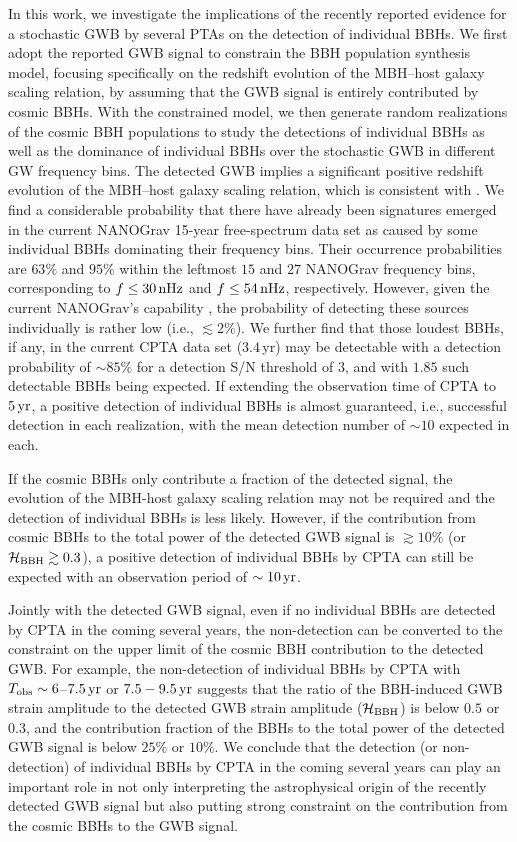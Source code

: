 \documentclass[twocolumn]{aastex631}
\newcommand{\calH}{{\mathcal{H}}}
\newcommand{\obs}{_{\rm obs}}
\newcommand{\yr}{{\rm\,yr}}
\newcommand{\nhz}{{\rm\,nHz}}
\begin{document}
In this work, we investigate the implications of the recently reported evidence
for a stochastic GWB by several PTAs \citep{NG23hd, EPTA23hd,PPTA23hd, CPTA23hd}
on the detection of individual BBHs. We first adopt the reported GWB signal to
constrain the BBH population synthesis model, focusing specifically on the
redshift evolution of the MBH--host galaxy scaling relation, by assuming that
the GWB signal is entirely contributed by cosmic BBHs. With the constrained
model, we then generate random realizations of the cosmic BBH populations to
study the detections of individual BBHs as well as the dominance of individual
BBHs over the stochastic GWB in different GW frequency bins. The detected GWB
implies a significant positive redshift evolution of the MBH--host galaxy
scaling relation, which is consistent with \citet{CYL23cgws}. We find a
considerable probability that there have already been signatures emerged in the
current NANOGrav 15-year free-spectrum data set as caused by some individual
BBHs dominating their frequency bins. Their occurrence probabilities are $63\%$
and $95\%$ within the leftmost $15$ and $27$ NANOGrav frequency bins,
corresponding to $f\leq 30\nhz$ and $f\leq 54\nhz$, respectively. However, given
the current NANOGrav's capability \citep{NG23indv}, the probability of detecting
these sources individually is rather low (i.e., $\lesssim 2\%$). We further find
that those loudest BBHs, if any, in the current CPTA data set ($3.4$\,yr) may be
detectable with a detection probability of $\sim 85\%$ for a detection S/N
threshold of $3$, and with $1.85$ such detectable BBHs being expected. If
extending the observation time of CPTA to $5\yr$, a positive detection of
individual BBHs is almost guaranteed, i.e., successful detection in each
realization, with the mean detection number of $\sim 10$ expected in each. 

If the cosmic BBHs only contribute a fraction of the detected signal, the
evolution of the MBH-host galaxy scaling relation may not be required and the
detection of individual BBHs is less likely.  However, if the contribution from
cosmic BBHs to the total power of the detected GWB signal is $\gtrsim 10\%$ (or
$\calH_{\rm BBH}\gtrsim 0.3$), a positive detection of individual BBHs by CPTA
can still be expected with an observation period of $\sim 10\yr$.

Jointly with the detected GWB signal, even if no individual BBHs are detected by
CPTA in the coming several years, the non-detection can be converted to the
constraint on the upper limit of the cosmic BBH contribution to the detected
GWB. For example, the non-detection of individual BBHs by CPTA with $T\obs \sim
6$--$7.5\yr$ or $7.5-9.5\yr$ suggests that the ratio of the BBH-induced GWB
strain amplitude to the detected GWB strain amplitude ($\calH_{\rm BBH}$) is
below $0.5$ or $0.3$, and the contribution fraction of the BBHs to the total
power of the detected GWB signal is below $25\%$ or $10\%$. We conclude that the
detection (or non-detection) of individual BBHs by CPTA in the coming several
years can play an important role in not only interpreting the astrophysical
origin of the recently detected GWB signal but also putting strong constraint on
the contribution from the cosmic BBHs to the GWB signal.
\end{document}
